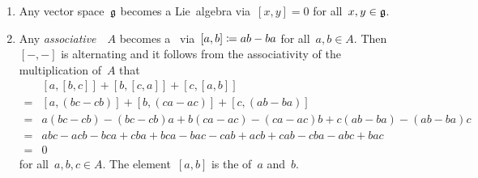\begin{examples}
  \label{examples for lie algebras}
  \leavevmode
  \begin{enumerate}
    \item
      Any vector space~$\mathfrak{g}$ becomes a Lie~algebra via~$[x,y] = 0$ for all~$x,y \in \mathfrak{g}$.
    \item
      Any \emph{associative}~{\algebra{$\kf$}}~$A$ becomes a~{\liealgebra{$\kf$}} via~$[a,b] \coloneqq ab - ba$ for all~$a, b \in A$.
      Then~$[-, -]$ is alternating and it follows from the associativity of the multiplication of~$A$ that
      \begin{align*}
         {}&  [a,[b,c]] + [b,[c,a]] + [c,[a,b]] \\
        ={}&  [a, (bc-cb)] + [b, (ca-ac)] + [c, (ab-ba)] \\
        ={}&  a(bc-cb)-(bc-cb)a + b(ca-ac) - (ca-ac)b + c(ab-ba) - (ab-ba)c \\
        ={}&  abc - acb - bca + cba + bca - bac - cab + acb + cab - cba - abc + bac \\
        ={}&  0
      \end{align*}
      for all~$a, b, c \in A$.
      The element~$[a,b]$ is the  of~$a$ and~$b$.
    

\end{enumerate}
\end{examples}
